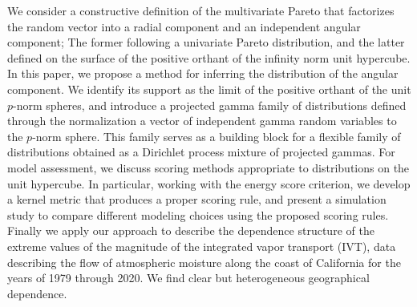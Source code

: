 We consider a constructive definition of the multivariate Pareto that factorizes the 
random vector into a radial component and an independent angular component; The former
following a univariate Pareto distribution, and the latter defined on the surface of the 
positive orthant of the infinity norm unit hypercube.  In this paper, we  propose a method 
for inferring the distribution of the angular component.  We identify its support 
as the limit of the positive orthant of the unit $p$-norm spheres, and introduce a 
projected gamma family of distributions defined through the normalization a vector of 
independent gamma random variables to the $p$-norm sphere.  This family serves as a 
building block for a flexible family of distributions obtained as a Dirichlet process 
mixture of projected gammas.  For model assessment, we discuss scoring methods appropriate 
to distributions on the unit hypercube.  In particular, working with the energy score
criterion, we develop a kernel metric that produces a  proper scoring rule, and present 
a simulation study to compare  different modeling choices using the proposed scoring rules.  
Finally we apply our  approach to describe the dependence structure of the extreme values of 
the magnitude  of the integrated vapor transport (IVT), data describing the flow 
of atmospheric moisture along the coast of California for the years of 1979 
through 2020.  We find clear but heterogeneous geographical dependence.